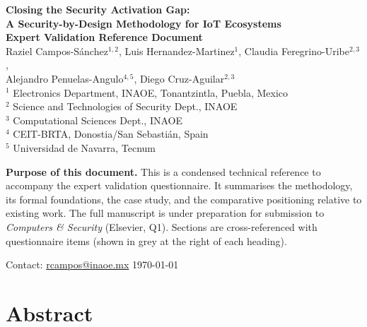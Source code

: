 \documentclass[12pt,a4paper]{article}
\begin{document}
\begin{titlepage}
  \centering
  \vspace*{1.5cm}
  {\Large\bfseries Closing the Security Activation Gap:\\[6pt]
   A Security-by-Design Methodology for IoT Ecosystems}\\[0.5cm]
  {\large\bfseries Expert Validation Reference Document}\\[1.5cm]

  {\normalsize
  Raziel Campos-Sánchez$^{1,2}$,\;
  Luis Hernandez-Martinez$^{1}$,\;
  Claudia Feregrino-Uribe$^{2,3}$,\\[4pt]
  Alejandro Penuelas-Angulo$^{4,5}$,\;
  Diego Cruz-Aguilar$^{2,3}$
  }\\[0.8cm]

  {\small
  $^1$ Electronics Department, INAOE, Tonantzintla, Puebla, Mexico\\
  $^2$ Science and Technologies of Security Dept., INAOE\\
  $^3$ Computational Sciences Dept., INAOE\\
  $^4$ CEIT-BRTA, Donostia/San Sebastián, Spain\\
  $^5$ Universidad de Navarra, Tecnum
  }\\[1.5cm]

  \begin{mdframed}[backgroundcolor=blue!4, linecolor=blue!30, linewidth=1pt,
                   innertopmargin=10pt, innerbottommargin=10pt,
                   innerleftmargin=12pt, innerrightmargin=12pt]
  \textbf{Purpose of this document.} This is a condensed technical reference to accompany the expert validation questionnaire. It summarises the methodology, its formal foundations, the case study, and the comparative positioning relative to existing work. The full manuscript is under preparation for submission to \textit{Computers \& Security} (Elsevier, Q1). Sections are cross-referenced with questionnaire items (shown in grey at the right of each heading).
  \end{mdframed}

  \vfill
  {\small Contact: \href{mailto:rcampos@inaoe.mx}{rcampos@inaoe.mx} \hfill \today}
\end{titlepage}

\section*{Abstract}
\end{document}
